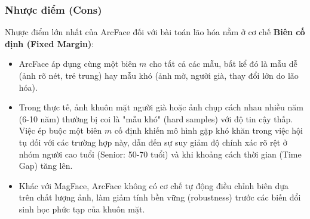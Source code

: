 \subsubsection{Nhược điểm (Cons)}
Nhược điểm lớn nhất của ArcFace đối với bài toán lão hóa nằm ở cơ chế \textbf{Biên cố định (Fixed Margin)}:
\begin{itemize}
    \item ArcFace áp dụng cùng một biên $m$ cho tất cả các mẫu, bất kể đó là mẫu dễ (ảnh rõ nét, trẻ trung) hay mẫu khó (ảnh mờ, người già, thay đổi lớn do lão hóa).
    \item Trong thực tế, ảnh khuôn mặt người già hoặc ảnh chụp cách nhau nhiều năm (6-10 năm) thường bị coi là "mẫu khó" (hard samples) với độ tin cậy thấp. Việc ép buộc một biên $m$ cố định khiến mô hình gặp khó khăn trong việc hội tụ đối với các trường hợp này, dẫn đến sự suy giảm độ chính xác rõ rệt ở nhóm người cao tuổi (Senior: 50-70 tuổi) và khi khoảng cách thời gian (Time Gap) tăng lên. 
    \item Khác với MagFace, ArcFace không có cơ chế tự động điều chỉnh biên dựa trên chất lượng ảnh, làm giảm tính bền vững (robustness) trước các biến đổi sinh học phức tạp của khuôn mặt.
\end{itemize}